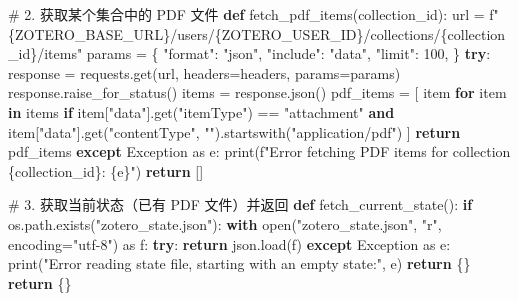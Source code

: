 \documentclass[
  letterpaper,
  DIV=11,
  numbers=noendperiod]{scrreprt}
\newenvironment{Shaded}{\begin{snugshade}}{\end{snugshade}}
\newcommand{\BuiltInTok}[1]{\textcolor[rgb]{0.00,0.23,0.31}{#1}}
\newcommand{\CommentTok}[1]{\textcolor[rgb]{0.37,0.37,0.37}{#1}}
\newcommand{\ControlFlowTok}[1]{\textcolor[rgb]{0.00,0.23,0.31}{\textbf{#1}}}
\newcommand{\DecValTok}[1]{\textcolor[rgb]{0.68,0.00,0.00}{#1}}
\newcommand{\ImportTok}[1]{\textcolor[rgb]{0.00,0.46,0.62}{#1}}
\newcommand{\KeywordTok}[1]{\textcolor[rgb]{0.00,0.23,0.31}{\textbf{#1}}}
\newcommand{\NormalTok}[1]{\textcolor[rgb]{0.00,0.23,0.31}{#1}}
\newcommand{\OperatorTok}[1]{\textcolor[rgb]{0.37,0.37,0.37}{#1}}
\newcommand{\PreprocessorTok}[1]{\textcolor[rgb]{0.68,0.00,0.00}{#1}}
\newcommand{\SpecialCharTok}[1]{\textcolor[rgb]{0.37,0.37,0.37}{#1}}
\newcommand{\SpecialStringTok}[1]{\textcolor[rgb]{0.13,0.47,0.30}{#1}}
\newcommand{\StringTok}[1]{\textcolor[rgb]{0.13,0.47,0.30}{#1}}
\begin{document}
\begin{Shaded}
\begin{Highlighting}[]
\CommentTok{\# 2. 获取某个集合中的 PDF 文件}
\KeywordTok{def}\NormalTok{ fetch\_pdf\_items(collection\_id):}
\NormalTok{    url }\OperatorTok{=} \SpecialStringTok{f"}\SpecialCharTok{\{}\NormalTok{ZOTERO\_BASE\_URL}\SpecialCharTok{\}}\SpecialStringTok{/users/}\SpecialCharTok{\{}\NormalTok{ZOTERO\_USER\_ID}\SpecialCharTok{\}}\SpecialStringTok{/collections/}\SpecialCharTok{\{}\NormalTok{collection\_id}\SpecialCharTok{\}}\SpecialStringTok{/items"}
\NormalTok{    params }\OperatorTok{=}\NormalTok{ \{}
        \StringTok{"format"}\NormalTok{: }\StringTok{"json"}\NormalTok{,}
        \StringTok{"include"}\NormalTok{: }\StringTok{"data"}\NormalTok{,}
        \StringTok{"limit"}\NormalTok{: }\DecValTok{100}\NormalTok{,}
\NormalTok{    \}}
    \ControlFlowTok{try}\NormalTok{:}
\NormalTok{        response }\OperatorTok{=}\NormalTok{ requests.get(url, headers}\OperatorTok{=}\NormalTok{headers, params}\OperatorTok{=}\NormalTok{params)}
\NormalTok{        response.raise\_for\_status()}
\NormalTok{        items }\OperatorTok{=}\NormalTok{ response.json()}
\NormalTok{        pdf\_items }\OperatorTok{=}\NormalTok{ [}
\NormalTok{            item }\ControlFlowTok{for}\NormalTok{ item }\KeywordTok{in}\NormalTok{ items}
            \ControlFlowTok{if}\NormalTok{ item[}\StringTok{"data"}\NormalTok{].get(}\StringTok{"itemType"}\NormalTok{) }\OperatorTok{==} \StringTok{"attachment"} \KeywordTok{and} 
\NormalTok{               item[}\StringTok{"data"}\NormalTok{].get(}\StringTok{"contentType"}\NormalTok{, }\StringTok{""}\NormalTok{).startswith(}\StringTok{"application/pdf"}\NormalTok{)}
\NormalTok{        ]}
        \ControlFlowTok{return}\NormalTok{ pdf\_items}
    \ControlFlowTok{except} \PreprocessorTok{Exception} \ImportTok{as}\NormalTok{ e:}
        \BuiltInTok{print}\NormalTok{(}\SpecialStringTok{f"Error fetching PDF items for collection }\SpecialCharTok{\{}\NormalTok{collection\_id}\SpecialCharTok{\}}\SpecialStringTok{: }\SpecialCharTok{\{}\NormalTok{e}\SpecialCharTok{\}}\SpecialStringTok{"}\NormalTok{)}
        \ControlFlowTok{return}\NormalTok{ []}

\CommentTok{\# 3. 获取当前状态（已有 PDF 文件）并返回}
\KeywordTok{def}\NormalTok{ fetch\_current\_state():}
    \ControlFlowTok{if}\NormalTok{ os.path.exists(}\StringTok{"zotero\_state.json"}\NormalTok{):}
        \ControlFlowTok{with} \BuiltInTok{open}\NormalTok{(}\StringTok{"zotero\_state.json"}\NormalTok{, }\StringTok{"r"}\NormalTok{, encoding}\OperatorTok{=}\StringTok{"utf{-}8"}\NormalTok{) }\ImportTok{as}\NormalTok{ f:}
            \ControlFlowTok{try}\NormalTok{:}
                \ControlFlowTok{return}\NormalTok{ json.load(f)}
            \ControlFlowTok{except} \PreprocessorTok{Exception} \ImportTok{as}\NormalTok{ e:}
                \BuiltInTok{print}\NormalTok{(}\StringTok{"Error reading state file, starting with an empty state:"}\NormalTok{, e)}
                \ControlFlowTok{return}\NormalTok{ \{\}}
    \ControlFlowTok{return}\NormalTok{ \{\}}


\end{Highlighting}
\end{Shaded}
\end{document}
